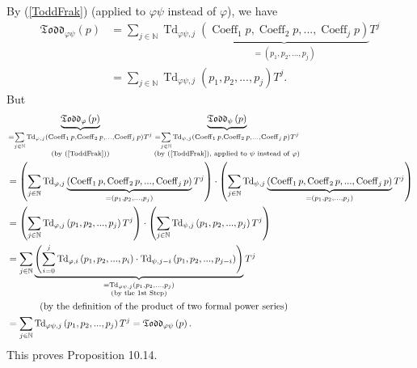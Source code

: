 \documentclass[numbers=enddot,12pt,final,onecolumn,notitlepage]{scrartcl}%
\begin{document}
By (\ref{ToddFrak}) (applied to $\varphi\psi$ instead of $\varphi$), we have%
\begin{align*}
\mathfrak{Todd}_{\varphi\psi}\left(  p\right)   &  =\sum\limits_{j\in
\mathbb{N}}\operatorname*{Td}\nolimits_{\varphi\psi,j}\underbrace{\left(
\operatorname*{Coeff}\nolimits_{1}p,\operatorname*{Coeff}\nolimits_{2}%
p,...,\operatorname*{Coeff}\nolimits_{j}p\right)  }_{=\left(  p_{1}%
,p_{2},...,p_{j}\right)  }T^{j}\\
&  =\sum_{j\in\mathbb{N}}\operatorname*{Td}\nolimits_{\varphi\psi,j}\left(
p_{1},p_{2},...,p_{j}\right)  T^{j}.
\end{align*}
But%
\begin{align*}
&  \underbrace{\mathfrak{Todd}_{\varphi}\left(  p\right)  }_{\substack{=\sum
\limits_{j\in\mathbb{N}}\operatorname*{Td}\nolimits_{\varphi,j}\left(
\operatorname*{Coeff}\nolimits_{1}p,\operatorname*{Coeff}\nolimits_{2}%
p,...,\operatorname*{Coeff}\nolimits_{j}p\right)  T^{j}\\\text{(by
(\ref{ToddFrak}))}}}\underbrace{\mathfrak{Todd}_{\psi}\left(  p\right)
}_{\substack{=\sum\limits_{j\in\mathbb{N}}\operatorname*{Td}\nolimits_{\psi
,j}\left(  \operatorname*{Coeff}\nolimits_{1}p,\operatorname*{Coeff}%
\nolimits_{2}p,...,\operatorname*{Coeff}\nolimits_{j}p\right)  T^{j}%
\\\text{(by (\ref{ToddFrak}), applied to }\psi\text{ instead of }%
\varphi\text{)}}}\\
&  =\left(  \sum\limits_{j\in\mathbb{N}}\operatorname*{Td}\nolimits_{\varphi
,j}\underbrace{\left(  \operatorname*{Coeff}\nolimits_{1}%
p,\operatorname*{Coeff}\nolimits_{2}p,...,\operatorname*{Coeff}\nolimits_{j}%
p\right)  }_{=\left(  p_{1},p_{2},...,p_{j}\right)  }T^{j}\right)
\cdot\left(  \sum\limits_{j\in\mathbb{N}}\operatorname*{Td}\nolimits_{\psi
,j}\underbrace{\left(  \operatorname*{Coeff}\nolimits_{1}%
p,\operatorname*{Coeff}\nolimits_{2}p,...,\operatorname*{Coeff}\nolimits_{j}%
p\right)  }_{=\left(  p_{1},p_{2},...,p_{j}\right)  }T^{j}\right) \\
&  =\left(  \sum\limits_{j\in\mathbb{N}}\operatorname*{Td}\nolimits_{\varphi
,j}\left(  p_{1},p_{2},...,p_{j}\right)  T^{j}\right)  \cdot\left(
\sum\limits_{j\in\mathbb{N}}\operatorname*{Td}\nolimits_{\psi,j}\left(
p_{1},p_{2},...,p_{j}\right)  T^{j}\right) \\
&  =\sum\limits_{j\in\mathbb{N}}\underbrace{\left(  \sum\limits_{i=0}%
^{j}\operatorname*{Td}\nolimits_{\varphi,i}\left(  p_{1},p_{2},...,p_{i}%
\right)  \cdot\operatorname*{Td}\nolimits_{\psi,j-i}\left(  p_{1}%
,p_{2},...,p_{j-i}\right)  \right)  }_{\substack{=\operatorname*{Td}%
\nolimits_{\varphi\psi,j}\left(  p_{1},p_{2},...,p_{j}\right)  \\\text{(by the
1st Step)}}}T^{j}\\
&  \ \ \ \ \ \ \ \ \ \ \left(  \text{by the definition of the product of two
formal power series}\right) \\
&  =\sum_{j\in\mathbb{N}}\operatorname*{Td}\nolimits_{\varphi\psi,j}\left(
p_{1},p_{2},...,p_{j}\right)  T^{j}=\mathfrak{Todd}_{\varphi\psi}\left(
p\right)  .
\end{align*}
This proves Proposition 10.14.
\end{document}
